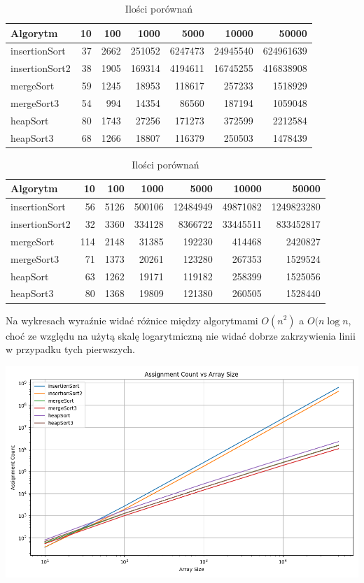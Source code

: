 \documentclass{article}
\begin{document}
\begin{table}[h]
\centering
\begin{tabular}{|l|r|r|r|r|r|r|}
\hline
\textbf{Algorytm} & \textbf{10} & \textbf{100} & \textbf{1000} & \textbf{5000} & \textbf{10000} & \textbf{50000} \\
\hline
insertionSort  & 37  & 2662   & 251052   & 6247473   & 24945540   & 624961639 \\
insertionSort2 & 38  & 1905   & 169314   & 4194611   & 16745255   & 416838908 \\
mergeSort      & 59  & 1245   & 18953    & 118617    & 257233     & 1518929 \\
mergeSort3     & 54  & 994    & 14354    & 86560     & 187194     & 1059048 \\
heapSort       & 80  & 1743   & 27256    & 171273    & 372599     & 2212584 \\
heapSort3      & 68  & 1266   & 18807    & 116379    & 250503     & 1478439 \\
\hline
\end{tabular}
\caption{Ilości przypisań}
\begin{tabular}{|l|r|r|r|r|r|r|}
\hline
\textbf{Algorytm} & \textbf{10} & \textbf{100} & \textbf{1000} & \textbf{5000} & \textbf{10000} & \textbf{50000} \\
\hline
insertionSort  & 56  & 5126   & 500106   & 12484949   & 49871082   & 1249823280 \\
insertionSort2 & 32  & 3360   & 334128   & 8366722    & 33445511   & 833452817 \\
mergeSort      & 114 & 2148   & 31385    & 192230     & 414468     & 2420827 \\
mergeSort3     & 71  & 1373   & 20261    & 123280     & 267353     & 1529524 \\
heapSort       & 63  & 1262   & 19171    & 119182     & 258399     & 1525056 \\
heapSort3      & 80  & 1368   & 19809    & 121380     & 260505     & 1528440 \\
\hline
\end{tabular}
\caption{Ilości porównań}
\end{table}

Na wykresach wyraźnie widać różnice między algorytmami \(O(n^2)\) a \(O(n\log{n}\), choć ze względu na użytą skalę logarytmiczną nie widać dobrze zakrzywienia linii w przypadku tych pierwszych. 

\includegraphics[width=0.95\linewidth]{Assignment plot.png}
\end{document}
